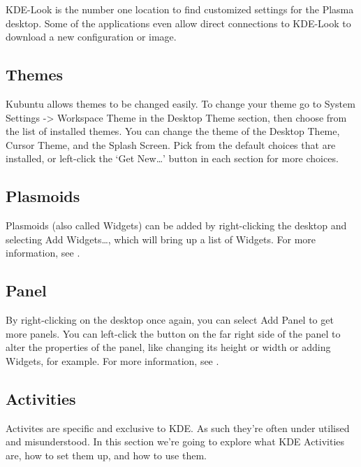 \documentclass[letterpaper,10pt,english]{sphinxmanual}
\begin{document}
KDE-Look is the number one location to find customized settings for the  Plasma desktop. Some of the applications even allow direct connections to KDE-Look to download a new configuration or image.


\subsection{Themes}
\label{\detokenize{docs/basic:themes}}
Kubuntu allows themes to be changed easily. To change your theme go to System Settings -\textgreater{} Workspace Theme in the Desktop Theme section, then choose from the list of installed themes. You can change the theme of the Desktop Theme, Cursor Theme, and the Splash Screen. Pick from the default choices that are installed, or left-click the ‘Get New…’ button in each section for more choices.


\subsection{Plasmoids}
\label{\detokenize{docs/basic:plasmoids}}
Plasmoids (also called Widgets) can be added by right-clicking the desktop and selecting Add Widgets…, which will bring up a list of Widgets. For more information, see .


\subsection{Panel}
\label{\detokenize{docs/basic:panel}}

By right-clicking on the desktop once again, you can select Add Panel to get more panels. You can left-click the button on the far right side of the panel to alter the properties of the panel, like changing its height or width or adding Widgets, for example. For more information, see .


\subsection{Activities}
\label{\detokenize{docs/basic:activities}}
Activites are specific and exclusive to KDE. As such they’re often under utilised and misunderstood. In this section we’re going to explore what KDE Activities are, how to set them up, and how to use them.
\end{document}
